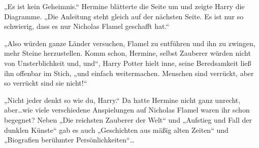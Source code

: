 „Es ist kein Geheimnis.“ Hermine blätterte die Seite um und zeigte Harry die Diagramme. „Die Anleitung steht gleich auf der nächsten Seite. Es ist nur so schwierig, dass es nur Nicholas Flamel geschafft hat.“

„Also würden ganze Länder versuchen, Flamel zu entführen und ihn zu zwingen, mehr Steine herzustellen. Komm schon, Hermine, selbst Zauberer würden nicht von Unsterblichkeit und, und“, Harry Potter hielt inne, seine Beredsamkeit ließ ihn offenbar im Stich, „und einfach weitermachen. Menschen sind verrückt, aber so verrückt sind sie nicht!“

„Nicht jeder denkt so wie du, Harry.“
Da hatte Hermine nicht ganz unrecht, aber…wie viele verschiedene Anspielungen auf Nicholas Flamel waren ihr schon begegnet?
Neben „Die reichsten Zauberer der Welt“ und „Aufstieg und Fall der dunklen Künste“ gab es auch „Geschichten aus mäßig alten Zeiten“ und „Biografien berühmter Persönlichkeiten“…

